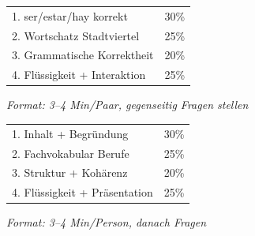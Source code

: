 \documentclass[11pt, a4paper]{article}
\begin{document}
\begin{minipage}[t]{0.48\textwidth}
\begin{tcolorbox}[
    colback=gruppeA!10,
    colframe=gruppeA,
    title={\footnotesize\bfseries Kriterien Gruppe A (Partnerprüfung)},
    fonttitle=\bfseries,
    boxrule=0.5pt,
    top=2pt, bottom=2pt, left=4pt, right=4pt
]
\footnotesize
\begin{tabular}{@{}lr@{}}
1. ser/estar/hay korrekt & 30\% \\
2. Wortschatz Stadtviertel & 25\% \\
3. Grammatische Korrektheit & 20\% \\
4. Flüssigkeit + Interaktion & 25\% \\
\end{tabular}

\vspace{0.1cm}
\textit{Format: 3--4 Min/Paar, gegenseitig Fragen stellen}
\end{tcolorbox}
\end{minipage}
\hfill
\begin{minipage}[t]{0.48\textwidth}
\begin{tcolorbox}[
    colback=gruppeB!10,
    colframe=gruppeB,
    title={\footnotesize\bfseries Kriterien Gruppe B (Kurzvortrag)},
    fonttitle=\bfseries,
    boxrule=0.5pt,
    top=2pt, bottom=2pt, left=4pt, right=4pt
]
\footnotesize
\begin{tabular}{@{}lr@{}}
1. Inhalt + Begründung & 30\% \\
2. Fachvokabular Berufe & 25\% \\
3. Struktur + Kohärenz & 20\% \\
4. Flüssigkeit + Präsentation & 25\% \\
\end{tabular}

\vspace{0.1cm}
\textit{Format: 3--4 Min/Person, danach Fragen}
\end{tcolorbox}
\end{minipage}

\vspace{0.2cm}

\end{document}
